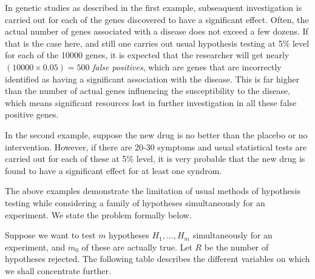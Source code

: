 \documentclass[
]{book}
\begin{document}
In genetic studies as described in the first example, subseaquent investigation is carried out for each of the genes discovered to have a significant effect. Often, the actual number of genes associated with a disease does not exceed a few dozens. If that is the case here, and still one carries out usual hypothesis testing at 5\% level for each of the 10000 genes, it is expected that the researcher will get nearly \((10000 \times 0.05) = 500\) \emph{false positives}, which are genes that are incorrectly identified as having a significant association with the disease. This is far higher than the number of actual genes influencing the susceptibility to the disease, which means significant resources lost in further investigation in all these false positive genes.

In the second example, suppose the new drug is no better than the placebo or no intervention. However, if there are 20-30 symptoms and usual statistical tests are carried out for each of these at 5\% level, it is very probable that the new drug is found to have a significant effect for at least one syndrom.

The above examples demonstrate the limitation of usual methods of hypothesis testing while considering a family of hypotheses simultaneously for an experiment. We state the problem formally below.

Suppose we want to test \(m\) hypotheses \(H_1, \ldots, H_m\) simultaneously for an experiment, and \(m_0\) of these are actually true. Let \(R\) be the number of hypotheses rejected. The following table describes the different variables on which we shall concentrate further.
\end{document}
